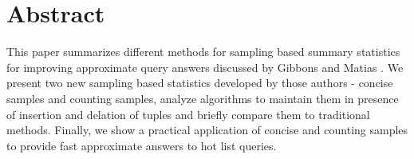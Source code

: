 \section{Abstract}
This paper summarizes different methods for sampling based summary
statistics for improving approximate query answers discussed by Gibbons and Matias
\cite{GM98}. We present two new sampling based statistics developed by
those authors - concise samples and counting samples, analyze algorithms to
maintain them in presence of insertion and delation of tuples and
briefly compare them to traditional methods.
Finally, we show a practical application of concise and counting
samples to provide fast approximate answers to hot list queries.

